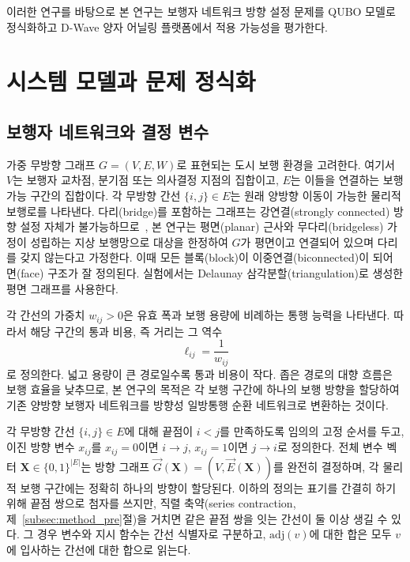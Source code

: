 \documentclass[twocolumn,a4paper]{article}
\begin{document}
이러한 연구를 바탕으로 본 연구는 보행자 네트워크 방향 설정 문제를 QUBO 모델로 정식화하고 D-Wave 양자 어닐링 플랫폼에서 적용 가능성을 평가한다.

\section{시스템 모델과 문제 정식화} \label{sec:model}

\subsection{보행자 네트워크와 결정 변수} \label{subsec:model_graph}

가중 무방향 그래프 $G=(V,E,W)$로 표현되는 도시 보행 환경을 고려한다. 여기서 \(V\)는 보행자 교차점, 분기점 또는 의사결정 지점의 집합이고, \(E\)는 이들을 연결하는 보행 가능 구간의 집합이다. 각 무방향 간선 \(\{i,j\}\in E\)는 원래 양방향 이동이 가능한 물리적 보행로를 나타낸다. 다리(bridge)를 포함하는 그래프는 강연결(strongly connected) 방향 설정 자체가 불가능하므로~\cite{robbins1939theorem}, 본 연구는 평면(planar) 근사와 무다리(bridgeless) 가정이 성립하는 지상 보행망으로 대상을 한정하여 \(G\)가 평면이고 연결되어 있으며 다리를 갖지 않는다고 가정한다. 이때 모든 블록(block)이 이중연결(biconnected)이 되어 면(face) 구조가 잘 정의된다. 실험에서는 Delaunay 삼각분할(triangulation)로 생성한 평면 그래프를 사용한다.

각 간선의 가중치 \(w_{ij}>0\)은 유효 폭과 보행 용량에 비례하는 통행 능력을 나타낸다. 따라서 해당 구간의 통과 비용, 즉 거리는 그 역수
\begin{equation}
    \ell_{ij}=\frac{1}{w_{ij}}
\end{equation}
로 정의한다. 넓고 용량이 큰 경로일수록 통과 비용이 작다. 좁은 경로의 대향 흐름은 보행 효율을 낮추므로, 본 연구의 목적은 각 보행 구간에 하나의 보행 방향을 할당하여 기존 양방향 보행자 네트워크를 방향성 일방통행 순환 네트워크로 변환하는 것이다.

각 무방향 간선 \(\{i,j\}\in E\)에 대해 끝점이 \(i<j\)를 만족하도록 임의의 고정 순서를 두고, 이진 방향 변수 \(x_{ij}\)를 \(x_{ij}=0\)이면 \(i\rightarrow j\), \(x_{ij}=1\)이면 \(j\rightarrow i\)로 정의한다. 전체 변수 벡터 \(\mathbf{X}\in\{0,1\}^{|E|}\)는 방향 그래프 \(\vec{G}(\mathbf{X})=(V,\vec{E}(\mathbf{X}))\)를 완전히 결정하며, 각 물리적 보행 구간에는 정확히 하나의 방향이 할당된다. 이하의 정의는 표기를 간결히 하기 위해 끝점 쌍으로 첨자를 쓰지만, 직렬 축약(series contraction, 제~\ref{subsec:method_pre}절)을 거치면 같은 끝점 쌍을 잇는 간선이 둘 이상 생길 수 있다. 그 경우 변수와 지시 함수는 간선 식별자로 구분하고, \(\mathrm{adj}(v)\)에 대한 합은 모두 \(v\)에 입사하는 간선에 대한 합으로 읽는다.
\end{document}
